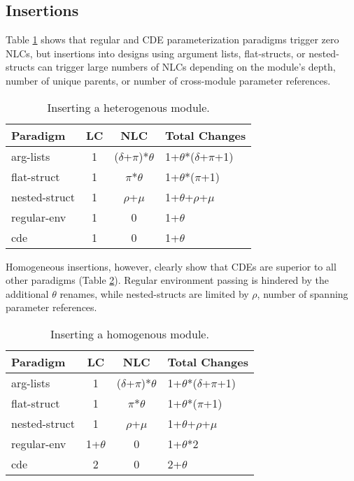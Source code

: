 \subsection{Insertions}

Table \ref{het:ins} shows that regular and CDE parameterization paradigms trigger zero NLCs, but insertions into designs using argument lists, flat-structs, or nested-structs can trigger large numbers of NLCs depending on the module's depth, number of unique parents, or number of cross-module parameter references.

\begin{table}
\centering
\begin{tabular*}{0.45\textwidth}{lccl}
\toprule
Paradigm    & LC & NLC & Total Changes\\
\midrule
arg-lists      &  1 & ($\delta$+$\pi$)*$\theta$ & 1+$\theta$*($\delta$+$\pi$+1)  \\
flat-struct  &  1 & $\pi$*$\theta$ & 1+$\theta$*($\pi$+1)  \\
nested-struct    &  1 & $\rho$+$\mu$ & 1+$\theta$+$\rho$+$\mu$  \\
regular-env    &  1 & 0&1+$\theta$ \\
cde &  1 & 0 & 1+$\theta$  \\
\bottomrule
\end{tabular*}
\caption{Inserting a heterogenous module.}
\label{het:ins}
\end{table}

Homogeneous insertions, however, clearly show that CDEs are superior to all other paradigms (Table \ref{hom:ins}). Regular environment passing is hindered by the additional $\theta$ renames, while nested-structs are limited by $\rho$, number of spanning parameter references. 

\begin{table}
\centering
\begin{tabular*}{0.45\textwidth}{lccl}
\toprule
Paradigm    & LC & NLC & Total Changes\\
\midrule
arg-lists      &  1 & ($\delta$+$\pi$)*$\theta$& 1+$\theta$*($\delta$+$\pi$+1)  \\
flat-struct  &  1 & $\pi$*$\theta$ & 1+$\theta$*($\pi$+1)  \\
nested-struct    &  1 & $\rho$+$\mu$ & 1+$\theta$+$\rho$+$\mu$  \\
regular-env    &  1+$\theta$ & 0 & 1+$\theta$*2 \\
cde &  2 & 0 & 2+$\theta$  \\
\bottomrule
\end{tabular*}
\caption{Inserting a homogenous module.}
\label{hom:ins}
\end{table}

